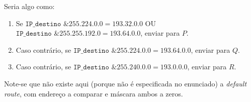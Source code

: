 \begin{enumerate}[leftmargin=\labelsep]
        Seria algo como:

        \begin{enumerate}
          \item Se $\texttt{IP\_destino} \text{ \& } 255.224.0.0 = 193.32.0.0$ OU
                $\texttt{IP\_destino} \text{ \& } 255.255.192.0 = 193.64.0.0$, enviar para $P$.
          \item Caso contrário, se $\texttt{IP\_destino} \text{ \& } 255.224.0.0 = 193.64.0.0$,
                enviar para $Q$.
          \item Caso contrário, se $\texttt{IP\_destino} \text{ \& } 255.240.0.0 = 193.0.0.0$, enviar para $R$.
        \end{enumerate}

        Note-se que não existe aqui (porque não é especificada no enunciado) a \textit{default route},
        com endereço a comparar e máscara ambos a zeros.
\end{enumerate}